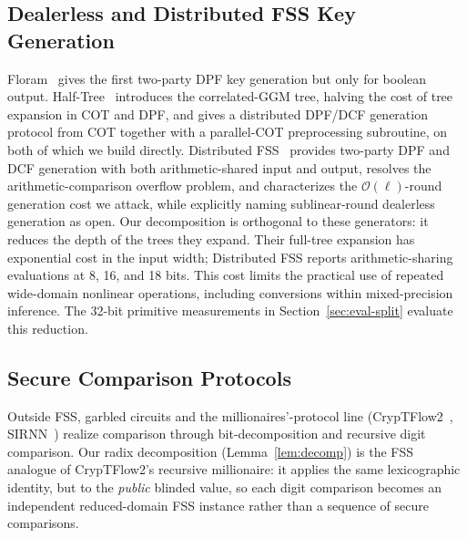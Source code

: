 \documentclass[journal]{IEEEtran}
\theoremstyle{definition}
\theoremstyle{plain}
\newcommand{\bigO}{\mathcal{O}}
\begin{document}
\subsection{Dealerless and Distributed FSS Key Generation}
Floram~\cite{floram} gives the first two-party DPF key generation but only for
boolean output. Half-Tree~\cite{halftree} introduces the correlated-GGM tree,
halving the cost of tree expansion in COT and DPF, and gives a distributed
DPF/DCF generation protocol from COT together with a parallel-COT preprocessing
subroutine, on both of which we build directly. Distributed FSS~\cite{distfss}
provides two-party DPF and DCF generation with both arithmetic-shared input and
output, resolves the arithmetic-comparison overflow problem, and characterizes the
$\bigO(\ell)$-round generation cost we attack, while explicitly naming
sublinear-round dealerless generation as open. Our decomposition is orthogonal to
these generators: it reduces the depth of the trees they expand. Their full-tree
expansion has exponential cost in the input width; Distributed FSS reports
arithmetic-sharing evaluations at 8, 16, and 18 bits. This cost limits the
practical use of repeated wide-domain nonlinear operations, including
conversions within mixed-precision inference. The 32-bit
primitive measurements in Section~\ref{sec:eval-split} evaluate this reduction.

\subsection{Secure Comparison Protocols}
Outside FSS, garbled circuits and the millionaires'-protocol line
(CrypTFlow2~\cite{cryptflow2}, SIRNN~\cite{sirnn}) realize comparison through
bit-decomposition and recursive digit comparison. Our radix decomposition
(Lemma~\ref{lem:decomp}) is the FSS analogue of CrypTFlow2's recursive
millionaire: it applies the same lexicographic identity, but to the
\emph{public} blinded value, so each digit comparison becomes an independent
reduced-domain FSS instance rather than a sequence of secure comparisons.
\end{document}
